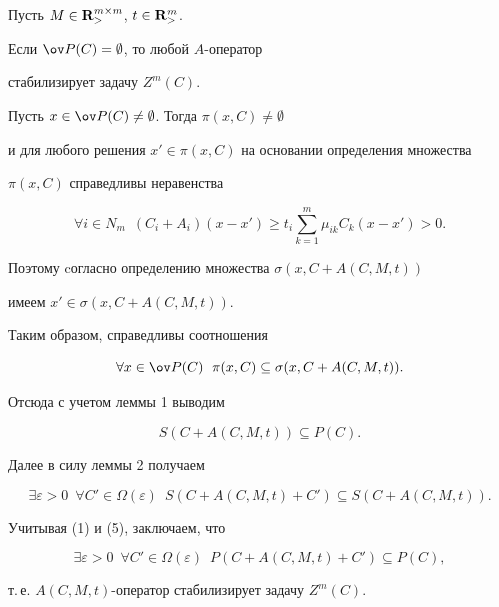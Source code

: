 \begin{pf}


Пусть $M\in {\bold R}_>^{m\times m}$, $t\in {\bold R}_>^m$.


Если $\ov P(C)= \emptyset$, то любой $A$-оператор


стабилизирует задачу $Z^m(C)$.





Пусть $x\in\ov P(C)\ne\emptyset$. Тогда $\pi(x, C)\ne\emptyset$


и для любого решения $x'\in \pi(x, C)$ на основании определения множества


$\pi(x, C)$ справедливы неравенства


$$


\forall i\in N_m\ \; (C_i+A_i)(x-x') \ge t_i\sum_{k=1}^m\mu_{ik}C_k(x-x')>0.


$$


Поэтому cогласно определению множества $\sigma(x, C+A(C, M, t))$


имеем $x'\in \sigma(x, C+A(C, M, t))$.


Таким образом, справедливы соотношения


$$


\forall x\in \ov P(C)\ \; \pi(x, C)\subseteq\sigma(x, C+A(C, M, t)).


$$


Отсюда с учетом леммы 1 выводим


\begin{equation}


S(C+A(C, M, t))\subseteq P(C).


\end{equation}


Далее в силу леммы 2 получаем


$$


\exists \varepsilon >0\ \; \forall C'\in \Omega(\varepsilon)\ \;


S(C+A(C, M, t)+C')\subseteq S(C+A(C, M, t)).


$$


Учитывая (1) и (5), заключаем, что


$$


\exists \varepsilon >0\ \; \forall C'\in \Omega(\varepsilon)\ \;


P(C+A(C, M, t)+C')\subseteq P(C),


$$


т.\,е. $A(C, M, t)$-оператор стабилизирует задачу $Z^m(C)$.


\end{pf}





